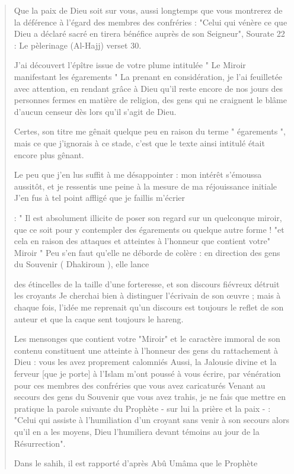 \begin{quote}
Que la paix de Dieu soit sur vous, aussi longtemps que vous montrerez de
la déférence à l'égard des membres des confréries : "Celui qui vénère ce
que Dieu a déclaré sacré en tirera bénéfice auprès de son Seigneur",
Sourate 22 : Le pèlerinage (Al-Hajj) verset 30.

J'ai découvert l'épître issue de votre plume intitulée " Le Miroir
manifestant les égarements " La prenant en considération, je l'ai
feuilletée avec attention, en rendant grâce à Dieu qu'il reste encore de
nos jours des personnes fermes en matière de religion, des gens qui ne
craignent le blâme d'aucun censeur dès lors qu'il s'agit de Dieu.

Certes, son titre me gênait quelque peu en raison du terme " égarements
", mais ce que j'ignorais à ce stade, c'est que le texte ainsi intitulé
était encore plus gênant.

Le peu que j'en lus suffit à me désappointer : mon intérêt s'émoussa
aussitôt, et je ressentis une peine à la mesure de ma réjouissance
initiale J'en fus à tel point affligé que je faillis m'écrier

: " Il est absolument illicite de poser son regard sur un quelconque
miroir, que ce soit pour y contempler des égarements ou quelque autre
forme ! "et cela en raison des attaques et atteintes à l'honneur que
contient votre" Miroir " Peu s'en faut qu'elle ne déborde de colère : en
direction des gens du Souvenir ( Dhakiroun ), elle lance

des étincelles de la taille d'une forteresse, et son discours fiévreux
détruit les croyants Je cherchai bien à distinguer l'écrivain de son
œuvre ; mais à chaque fois, l'idée me reprenait qu'un discours est
toujours le reflet de son auteur et que la caque sent toujours le
hareng.

Les mensonges que contient votre "Miroir" et le caractère immoral de son
contenu constituent une atteinte à l'honneur des gens du rattachement à
Dieu : vous les avez proprement calomniés Aussi, la Jalousie divine et
la ferveur {[}que je porte{]} à l'Islam m'ont poussé à vous écrire, par
vénération pour ces membres des confréries que vous avez caricaturés
Venant au secours des gens du Souvenir que vous avez trahis, je ne fais
que mettre en pratique la parole suivante du Prophète - sur lui la
prière et la paix - : "Celui qui assiste à l'humiliation d'un croyant
sans venir à son secours alors qu'il en a les moyens, Dieu l'humiliera
devant témoins au jour de la Résurrection".

Dans le sahih, il est rapporté d'après Abû Umâma que le Prophète


\end{quote}
